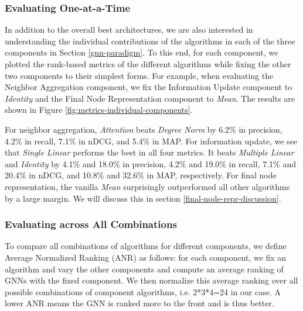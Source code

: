 \documentclass{article}
\begin{document}
\subsubsection{Evaluating One-at-a-Time} \label{eval-one-at-a-time}

In addition to the overall best architectures, we are also interested in understanding the individual contributions of the algorithms in each of the three components in Section \ref{gnn-paradigm}. To this end, for each component, we plotted the rank-based metrics of the different algorithms while fixing the other two components to their simplest forms. For example, when evaluating the Neighbor Aggregation component, we fix the Information Update component to \textit{Identity} and the Final Node Representation component to \textit{Mean}. The results are shown in Figure \ref{fig:metrics-individual-components}.

For neighbor aggregation, \textit{Attention} beats \textit{Degree Norm} by 6.2\% in precision, 4.2\% in recall, 7.1\% in nDCG, and 5.4\% in MAP. For information update, we see that \textit{Single Linear} performs the best in all four metrics. It beats \textit{Multiple Linear} and \textit{Identity} by 4.1\% and 18.0\% in precision, 4.2\% and 19.0\% in recall, 7.1\% and 20.4\% in nDCG, and 10.8\% and 32.6\% in MAP, respectively. For final node representation, the vanilla \textit{Mean} surprisingly outperformed all other algorithms by a large margin. We will discuss this in section \ref{final-node-repr-discussion}.



\subsubsection{Evaluating across All Combinations}

To compare all combinations of algorithms for different components, we define Average Normalized Ranking (ANR) as follows: for each component, we fix an algorithm and vary the other components and compute an average ranking of GNNs with the fixed component. We then normalize this average ranking over all possible combinations of component algorithms, i.e. 2*3*4=24 in our case.  A lower ANR means the GNN is ranked more to the front and is thus better. 
\end{document}
